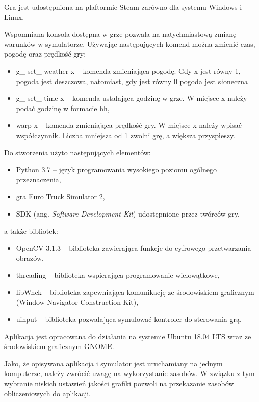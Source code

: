 Gra jest udostępniona na plaftormie Steam zarówno dla systemu Windows i Linux.

Wspomniana konsola dostępna w grze pozwala na natychmiastową zmianę warunków w symulatorze. 
Używając następujących komend można zmienić czas, pogodę oraz prędkość gry:

\begin{itemize}
\item g\_ set\_ weather x -- komenda zmieniająca pogodę. Gdy x jest równy 1, pogoda jest deszczowa, natomiast, gdy jest równy 0 pogoda jest słoneczna
\item g\_ set\_ time x -- komenda ustalająca godzinę w grze. W miejsce x należy podać godzinę w formacie hh,
\item warp x -- komenda zmieniająca prędkość gry. W miejsce x należy wpisać współczynnik. Liczba mniejsza od 1 zwolni grę, a większa przyspieszy.
\end{itemize}

Do stworzenia użyto następujących elementów:
\begin{itemize}
\item Python 3.7 -- język programowania wysokiego poziomu ogólnego przeznaczenia,
\item gra Euro Truck Simulator 2,
\item SDK (ang. \textit{Software Development Kit}) udostępnione przez twórców gry,
\end{itemize}
a także bibliotek: 
\begin{itemize}
\item OpenCV 3.1.3 -- biblioteka zawierająca funkcje do cyfrowego przetwarzania obrazów,
\item threading -- biblioteka wspierająca programowanie wielowątkowe,
\item libWnck -- biblioteka zapewniająca komunikację ze środowiskiem graficznym (Window Navigator Construction Kit),
\item uinput -- biblioteka pozwalająca symulować kontroler do sterowania grą.
\end{itemize}

Aplikacja jest opracowana do działania na systemie Ubuntu 18.04 LTS wraz ze środowiskiem graficznym GNOME.

Jako, że opisywana aplikacja i symulator jest uruchamiany na jednym komputerze, należy zwrócić uwagę na wykorzystanie zasobów. 
W związku z tym wybranie niskich ustawień jakości grafiki pozwoli na przekazanie zasobów obliczeniowych do aplikacji.

